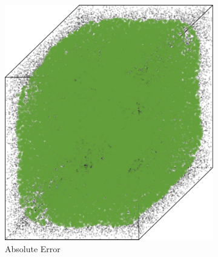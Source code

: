 			\begin{figure}[b!]
				\centering
				\begin{subfigure}{0.23\textwidth}
					\centering
					\includegraphics[keepaspectratio=true, width=\textwidth, height=0.23\textheight]{discussion/img/ferdosi_3_more_noise_abs_error_mbeSmallerThansambe.png}
					\caption{Absolute Error}
					\label{fig:discussion:ferdosi3Noise:mbeLowerError}
				\end{subfigure}		
				\begin{subfigure}{0.23\textwidth}
					\centering

\end{subfigure}
\end{figure}
